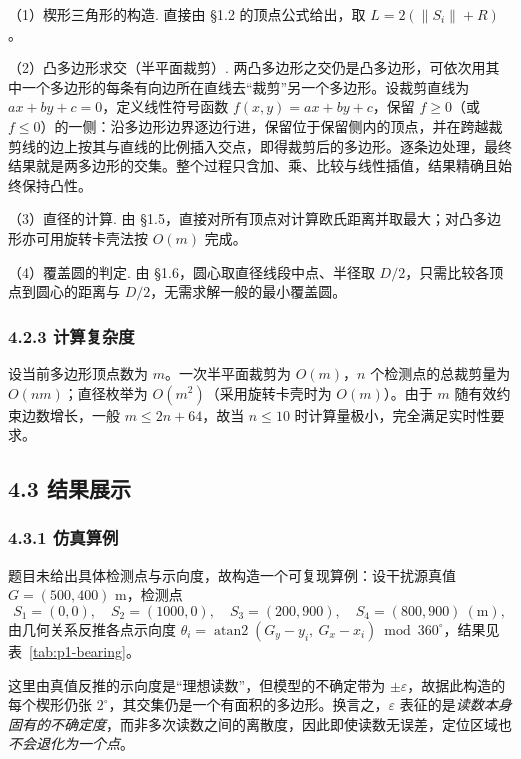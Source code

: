 \documentclass[UTF8, zihao=5,AutoFakeBold=2]{ctexart}
\begin{document}
	（1）楔形三角形的构造. 直接由 \S1.2 的顶点公式给出，取 \(L=2(\lVert S_i\rVert+R)\)。

	（2）凸多边形求交（半平面裁剪）. 两凸多边形之交仍是凸多边形，可依次用其中一个多边形的每条有向边所在直线去“裁剪”另一个多边形。设裁剪直线为 \(ax+by+c=0\)，定义线性符号函数 \(f(x,y)=ax+by+c\)，保留 \(f\ge0\)（或 \(f\le0\)）的一侧：沿多边形边界逐边行进，保留位于保留侧内的顶点，并在跨越裁剪线的边上按其与直线的比例插入交点，即得裁剪后的多边形。逐条边处理，最终结果就是两多边形的交集。整个过程只含加、乘、比较与线性插值，结果精确且始终保持凸性。

	（3）直径的计算. 由 \S1.5，直接对所有顶点对计算欧氏距离并取最大；对凸多边形亦可用旋转卡壳法按 \(O(m)\) 完成。

	（4）覆盖圆的判定. 由 \S1.6，圆心取直径线段中点、半径取 \(D/2\)，只需比较各顶点到圆心的距离与 \(D/2\)，无需求解一般的最小覆盖圆。

	\subsubsection*{4.2.3 \quad 计算复杂度}

	设当前多边形顶点数为 \(m\)。一次半平面裁剪为 \(O(m)\)，\(n\) 个检测点的总裁剪量为 \(O(nm)\)；直径枚举为 \(O(m^2)\)（采用旋转卡壳时为 \(O(m)\)）。由于 \(m\) 随有效约束边数增长，一般 \(m\le2n+64\)，故当 \(n\le10\) 时计算量极小，完全满足实时性要求。

	\subsection*{4.3 \quad 结果展示}

	\subsubsection*{4.3.1 \quad 仿真算例}

	题目未给出具体检测点与示向度，故构造一个可复现算例：设干扰源真值 \(G=(500,400)\) m，检测点
	\[
		S_1=(0,0),\quad S_2=(1000,0),\quad S_3=(200,900),\quad S_4=(800,900)\ (\text{m}),
	\]
	由几何关系反推各点示向度 \(\theta_i=\operatorname{atan2}(G_y-y_i,\ G_x-x_i)\bmod360^\circ\)，结果见表~\ref{tab:p1-bearing}。

	这里由真值反推的示向度是“理想读数”，但模型的不确定带为 \(\pm\varepsilon\)，故据此构造的每个楔形仍张 \(2^\circ\)，其交集仍是一个有面积的多边形。换言之，\(\varepsilon\) 表征的是\emph{读数本身固有的不确定度}，而非多次读数之间的离散度，因此即使读数无误差，定位区域也\emph{不会退化为一个点}。
\end{document}
